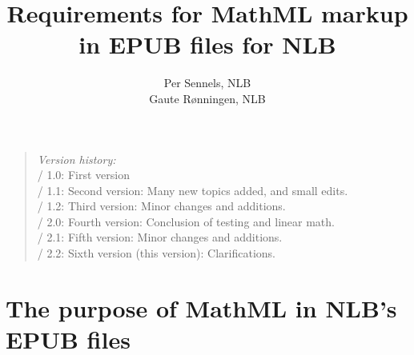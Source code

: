 \documentclass[english,a4paper,11pt]{article}
\title{Requirements for MathML markup\\ in EPUB files for NLB}
\author{Per Sennels, NLB\\Gaute Rønningen, NLB}
\begin{document}
	\bunntekst
	\thispagestyle{empty}
	\raggedright
	
	\maketitle
	\thispagestyle{empty}
	\vfill
	\begin{quote} {
		\bigskip
		\emph{Version history:}\\
		\textbullet{} / 1.0: First version\\
		\textbullet{} / 1.1: Second version: Many new topics added, and small edits.\\
		\textbullet{} / 1.2: Third version: Minor changes and additions.\\
		\textbullet{} / 2.0: Fourth version: Conclusion of testing and linear math.\\
        \textbullet{} / 2.1: Fifth version: Minor changes and additions.\\
        \textbullet{} / 2.2: Sixth version (this version): Clarifications.\\
        \bigskip
	}
	\end{quote}
	\vfill
	\pagebreak
	\tableofcontents
	\vfill
	\pagebreak

\section{The purpose of MathML in NLB's EPUB files}
\end{document}
